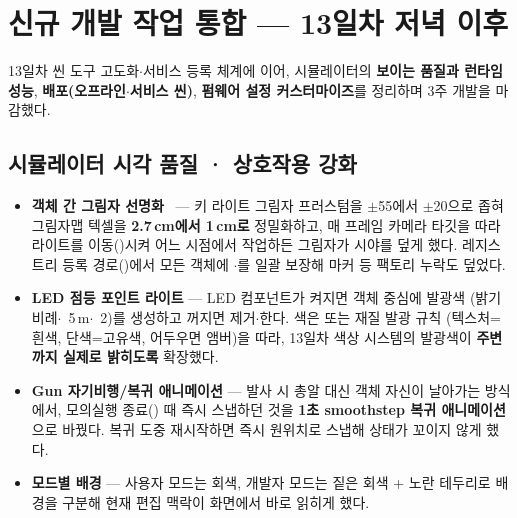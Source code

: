\smallskip
{}

\section{신규 개발 작업 통합 --- 13일차 저녁 이후}
13일차 씬 도구 고도화$\cdot$서비스 등록 체계에 이어, 시뮬레이터의 \textbf{보이는 품질과
런타임 성능}, \textbf{배포(오프라인$\cdot$서비스 씬)}, \textbf{펌웨어 설정 커스터마이즈}를
정리하며 3주 개발을 마감했다.

\subsection{시뮬레이터 시각 품질 · 상호작용 강화}
\begin{itemize}
  \item \textbf{객체 간 그림자 선명화}~\cite{akenine2018realtime} --- 키 라이트 그림자 프러스텀을 $\pm$55에서
  $\pm$20으로 좁혀 그림자맵 텍셀을 \textbf{2.7\,cm에서 1\,cm로} 정밀화하고, 매 프레임
  카메라 타깃을 따라 라이트를 이동()시켜 어느 시점에서 작업하든
  그림자가 시야를 덮게 했다. 레지스트리 등록 경로()에서 모든 객체에
  $\cdot$를 일괄 보장해 마커 등 팩토리 누락도 덮었다.
  \item \textbf{LED 점등 포인트 라이트} --- LED 컴포넌트가 켜지면 객체 중심에 발광색
  (밝기 비례$\cdot$~5\,m$\cdot$~2)를 생성하고
  꺼지면 제거$\cdot$한다. 색은  또는 재질 발광 규칙
  (텍스처=흰색, 단색=고유색, 어두우면 앰버)을 따라, 13일차 색상 시스템의 발광색이
  \textbf{주변까지 실제로 밝히도록} 확장했다.
  \item \textbf{Gun 자기비행/복귀 애니메이션} --- 발사 시 총알 대신 객체 자신이 날아가는
  방식에서, 모의실행 종료() 때 즉시 스냅하던 것을 \textbf{1초 smoothstep
  복귀 애니메이션}으로 바꿨다. 복귀 도중 재시작하면 즉시 원위치로 스냅해 상태가 꼬이지
  않게 했다.
  \item \textbf{모드별 배경} --- 사용자 모드는 회색, 개발자 모드는 짙은 회색 + 노란
  테두리로 배경을 구분해 현재 편집 맥락이 화면에서 바로 읽히게 했다.
\end{itemize}

